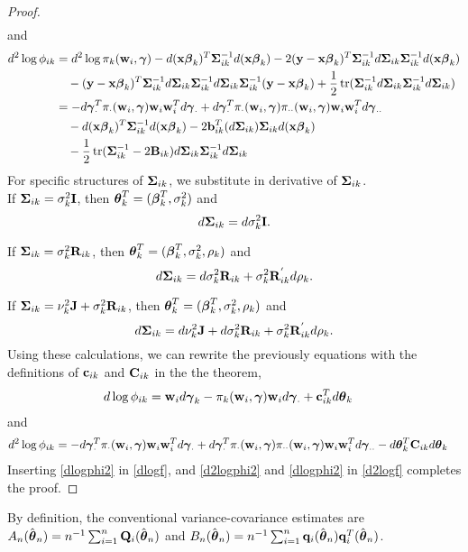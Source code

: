 \begin{proof}
\begin{align*}
\end{align*}
and
\begin{align*}
d^{2}\log \phi_{ik}&=d^{2}\log \pi_{k}(\mathbf w_{i},\boldsymbol\gamma)-d(\mathbf x\boldsymbol \beta_{k})^{T}\boldsymbol\Sigma_{ik}^{-1}d(\mathbf x\boldsymbol \beta_{k})-2(\mathbf y-\mathbf x\boldsymbol \beta_{k})^{T}\boldsymbol\Sigma_{ik}^{-1}d\boldsymbol\Sigma_{ik}\boldsymbol\Sigma_{ik}^{-1}d(\mathbf x\boldsymbol\beta_{k})\\
&\quad-(\mathbf y-\mathbf x\boldsymbol \beta_{k})^{T}\boldsymbol\Sigma_{ik}^{-1}d\boldsymbol\Sigma_{ik}\boldsymbol\Sigma_{ik}^{-1}d\boldsymbol\Sigma_{ik}\boldsymbol\Sigma_{ik}^{-1}(\mathbf y-\mathbf x\boldsymbol\beta_{k})+\frac{1}{2}\operatorname{tr}(\boldsymbol\Sigma_{ik}^{-1}d\boldsymbol\Sigma_{ik}\boldsymbol\Sigma_{ik}^{-1}d\boldsymbol\Sigma_{ik})\\
&=-d\boldsymbol\gamma_{\cdot}^{T}\pi_{\cdot}(\mathbf w_{i},\boldsymbol\gamma)\mathbf w_{i}\mathbf w_{i}^{T}d\boldsymbol\gamma_{\cdot}+d\boldsymbol\gamma_{\cdot}^{T}\pi_{\cdot}(\mathbf w_{i},\boldsymbol\gamma)\pi_{\cdot\cdot}(\mathbf w_{i},\boldsymbol\gamma)\mathbf w_{i}\mathbf w_{i}^{T}d\boldsymbol\gamma_{\cdot\cdot}\\
&\quad-d(\mathbf x\boldsymbol \beta_{k})^{T}\boldsymbol\Sigma_{ik}^{-1}d(\mathbf x\boldsymbol \beta_{k})-2\mathbf b_{ik}^{T}(d\boldsymbol\Sigma_{ik})\boldsymbol\Sigma_{ik}d(\mathbf x\boldsymbol\beta_{k})\\
&\quad-\frac{1}{2}\operatorname{tr}(\boldsymbol\Sigma_{ik}^{-1}-2\mathbf B_{ik})d\boldsymbol\Sigma_{ik}\boldsymbol\Sigma_{ik}^{-1}d\boldsymbol\Sigma_{ik}
\end{align*}
For specific structures of $\boldsymbol\Sigma_{ik}$, we substitute in derivative of $\boldsymbol\Sigma_{ik}$.\\

If $\boldsymbol\Sigma_{ik}=\sigma_{k}^{2}\mathbf I$, then $\boldsymbol\theta_{k}^{T}=(\boldsymbol\beta_{k}^{T},\sigma^{2}_{k})$ and
$$d\boldsymbol\Sigma_{ik}=d\sigma_{k}^{2}\mathbf I.$$

If $\boldsymbol\Sigma_{ik}=\sigma_{k}^{2}\mathbf R_{ik}$, then $\boldsymbol\theta_{k}^{T}=(\boldsymbol\beta_{k}^{T},\sigma^{2}_{k},\rho_{k})$ and
$$d\boldsymbol\Sigma_{ik}=d\sigma_{k}^{2}\mathbf R_{ik} +\sigma_{k}^{2}\mathbf R^{'}_{ik}d\rho_{k}.$$

If $\boldsymbol\Sigma_{ik}=\nu_{k}^{2}\mathbf J+\sigma_{k}^{2}\mathbf R_{ik}$, then $\boldsymbol\theta_{k}^{T}=(\boldsymbol\beta_{k}^{T},\sigma^{2}_{k},\rho_{k})$ and
$$d\boldsymbol\Sigma_{ik}=d\nu_{k}^{2}\mathbf J + d\sigma_{k}^{2}\mathbf R_{ik} +\sigma_{k}^{2}\mathbf R^{'}_{ik}d\rho_{k}.$$
Using these calculations, we can rewrite the previously equations with the definitions of $\mathbf c_{ik}$ and $\mathbf C_{ik}$ in the the theorem,
\begin{align}\label{dlogphi2}
d\log \phi_{ik}&=\mathbf w_{i} d\boldsymbol \gamma_{k} -\pi_{k}(\mathbf w_{i},\boldsymbol\gamma)\mathbf w_{i}d\boldsymbol\gamma_{\cdot}+\mathbf c^{T}_{ik}d\boldsymbol\theta_{k} 
\end{align}
and
\begin{align}\label{d2logphi2}
d^{2}\log \phi_{ik}
&=-d\boldsymbol\gamma_{\cdot}^{T}\pi_{\cdot}(\mathbf w_{i},\boldsymbol\gamma)\mathbf w_{i}\mathbf w_{i}^{T}d\boldsymbol\gamma_{\cdot}+d\boldsymbol\gamma_{\cdot}^{T}\pi_{\cdot}(\mathbf w_{i},\boldsymbol\gamma)\pi_{\cdot\cdot}(\mathbf w_{i},\boldsymbol\gamma)\mathbf w_{i}\mathbf w_{i}^{T}d\boldsymbol\gamma_{\cdot\cdot}-d\boldsymbol\theta_{k}^{T}\mathbf C_{ik}d\boldsymbol\theta_{k}
\end{align}
Inserting \eqref{dlogphi2} in \eqref{dlogf}, and \eqref{d2logphi2} and \eqref{dlogphi2} in \eqref{d2logf} completes the proof.
\end{proof}
By definition, the conventional variance-covariance estimates are\\ 
$A_{n}(\hat{\boldsymbol\theta}_{n})=n^{-1}\sum_{i=1}^{n}\mathbf Q_{i}(\hat{\boldsymbol \theta}_{n})$ and $B_{n}(\hat{\boldsymbol\theta}_{n})=n^{-1}\sum_{i=1}^{n}\mathbf q_{i}(\hat{\boldsymbol\theta}_{n})\mathbf q_{i}^{T}(\hat{\boldsymbol\theta}_{n})$. 


